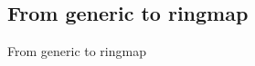 \documentclass{beamer}
\begin{document}
\begin{frame}
\begin{columns}
\end{columns}
\end{frame}

\subsection*{From generic to ringmap}

\begin{frame}
	\begin{center}
	\huge{From generic to ringmap}
	\end{center}
\end{frame}
\end{document}
